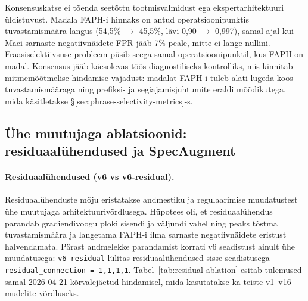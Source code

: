 Konsensuskatse ei tõenda seetõttu tootmisvalmidust ega ekspertarhitektuuri üldistuvust. Madala FAPH-i hinnaks on antud operatsioonipunktis tuvastamismäära langus (54,5\% $\rightarrow$ 45,5\%, lävi 0,90 $\rightarrow$ 0,997), samal ajal kui Maci sarnaste negatiivnäidete FPR jääb 7\% peale, mitte ei lange nullini. Fraasiselektiivsuse probleem püsib seega samal operatsioonipunktil, kus FAPH on madal. Konsensus jääb käesolevas töös diagnostiliseks kontrolliks, mis kinnitab mitmemõõtmelise hindamise vajadust: madalat FAPH-i tuleb alati lugeda koos tuvastamismääraga ning prefiksi- ja segiajamisjuhtumite eraldi mõõdikutega, mida käsitletakse §\ref{sec:phrase-selectivity-metrics}-s.

\subsection{Ühe muutujaga ablatsioonid: residuaalühendused ja SpecAugment}
\label{sec:residual-ablation}

\paragraph{Residuaalühendused (v6 vs v6-residual).}
Residuaalühenduste mõju eristatakse andmestiku ja regulaarimise muudatustest ühe muutujaga arhitektuurivõrdlusega. Hüpotees oli, et residuaalühendus parandab gradiendivoogu ploki sisendi ja väljundi vahel ning peaks tõstma tuvastamismäära ja langetama FAPH-i ilma sarnaste negatiivnäidete eristust halvendamata. Pärast andmelekke parandamist korrati v6 seadistust ainult ühe muudatusega: \texttt{v6-residual} lülitas residuaalühendused sisse seadistusega \texttt{residual\_connection\,=\,1,1,1,1}. Tabel~\ref{tab:residual-ablation} esitab tulemused samal 2026-04-21 kõrvalejäetud hindamisel, mida kasutatakse ka teiste v1--v16 mudelite võrdluseks.

\begin{table}[H]
\centering
\caption{Residuaalühenduste mõju võrdlus: v6 (OFF) ja v6-residual (ON), lävi\,=\,0,995. Andmestik ja treeninguseadistus on samad; muutub ainult \texttt{residual\_connection}. Veerud \enquote{Tuv. A} ja \enquote{Tuv. B} on Kõneleja~A XTTS ($N=48$) ja Kõneleja~B ($N=11$) kõrvalejäetud klippide tuvastamismäär (\%, kõrgem parem); \enquote{HN Mac} ja \enquote{HN A} on sarnaste negatiivnäidete valeaktiveeringu määr (\%, madalam parem) vastavalt Maci $\sim$Kratt-prefiksinäidetel ja Kõneleja~A XTTS sarnastel klippidel; \enquote{FAPH CV} on voogedastusrežiimi valeaktiveeringute arv tunnis Common~Voice ET kõrvalejäetud komplektil.}
\label{tab:residual-ablation}
\scriptsize
{}
\end{table}

